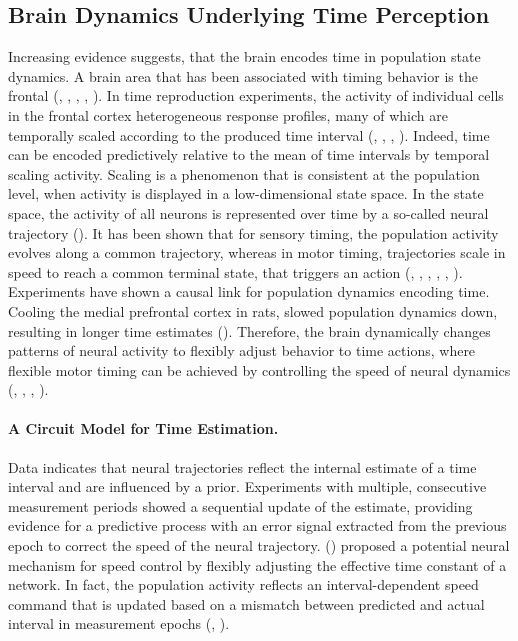 \documentclass[10pt]{article}
\begin{document}
\subsection{Brain Dynamics Underlying Time Perception}
Increasing evidence suggests, that the brain encodes time in population state dynamics. 
A brain area that has been associated with timing behavior is the frontal (\cite{Shima2000}, \cite{Lewis2004}, \cite{Genovesio2006}, \cite{Emmons2017}, \cite{Wang2018}).
In time reproduction experiments, the activity of individual cells in the frontal cortex heterogeneous response profiles, many of which are temporally scaled according to the produced time interval (\cite{Remington2018}, \cite{Wang2018}, \cite{Sohn2019}, \cite{Henke2021}).
Indeed, time can be encoded predictively relative to the mean of time intervals by temporal scaling activity.
Scaling is a phenomenon that is consistent at the population level, when activity is displayed in a low-dimensional state space. In the state space, the activity of all neurons is represented over time by a so-called neural trajectory (\cite{Cueva2022}).
It has been shown that for sensory timing, the population activity evolves along a common trajectory, whereas in motor timing, trajectories scale in speed to reach a common terminal state, that triggers an action (\cite{Mita2009}, \cite{Murakami2014}, \cite{Wang2018}, \cite{Sohn2019}, \cite{Henke2021}, \cite{Meirhaeghe2021}).
Experiments have shown a causal link for population dynamics encoding time. Cooling the  medial prefrontal cortex in rats, slowed population dynamics down, resulting in longer time estimates (\cite{Xu2014}). 
Therefore, the brain dynamically changes patterns of neural activity to flexibly adjust behavior to time actions, where flexible motor timing can be achieved by controlling the speed of neural dynamics (\cite{Remington2018}, \cite{Wang2018}, \cite{Sohn2019}, \cite{Tsao2022}).

\paragraph{A Circuit Model for Time Estimation.}
Data indicates that neural trajectories reflect the internal estimate of a time interval and are influenced by a prior.
Experiments with multiple, consecutive measurement periods showed a sequential update of the estimate, providing evidence for a predictive process with an error signal extracted from the previous epoch to correct the speed of the neural trajectory.
\citeauthor{Wang2018} (\citeyear{Wang2018}) proposed a potential neural mechanism for speed control by flexibly adjusting the effective time constant of a network.
In fact, the population activity reflects an interval-dependent speed command that is updated based on a mismatch between predicted and actual interval in measurement epochs (\cite{Wang2018}, \cite{Egger2019}). 
\end{document}
